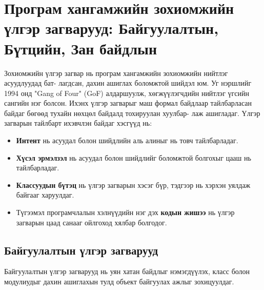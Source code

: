 \section{Програм хангамжийн зохиомжийн үлгэр загварууд: Байгуулалтын, Бүтцийн, Зан байдлын}
Зохиомжийн үлгэр загвар нь програм хангамжийн зохиомжийн нийтлэг асуудлуудад бат- лагдсан, дахин ашиглах боломжтой шийдэл юм. Уг нэршлийг 1994 онд "Gang of Four" (GoF) алдаршуулж, хөгжүүлэгчдийн нийтлэг үгсийн сангийн нэг болсон. Ихэнх үлгэр загварыг маш формал байдлаар тайлбарласан байдаг бөгөөд тухайн нөхцөл байдалд тохируулан хуулбар- лаж ашигладаг. Үлгэр загварын тайлбарт ихэвчлэн байдаг хэсгүүд нь:
\begin{itemize}
	\item \textbf{Интент} нь асуудал болон шийдлийн аль алиныг нь товч тайлбарладаг.
	\item \textbf{Хүсэл эрмэлзэл} нь асуудал болон шийдлийг боломжтой болгохыг цааш нь тайлбарладаг.
	\item \textbf{Классуудын бүтэц} нь үлгэр загварын хэсэг бүр, тэдгээр нь хэрхэн уялдаж байгааг харуулдаг.
	\item Түгээмэл програмчлалын хэлнүүдийн нэг дэх \textbf{кодын жишээ} нь үлгэр загварын цаад санааг ойлгоход хялбар болгодог.
\end{itemize}
\subsection{Байгуулалтын үлгэр загварууд}
Байгуулалтын үлгэр загварууд нь уян хатан байдлыг нэмэгдүүлэх, класс болон модулиудыг дахин ашиглахын тулд объект байгуулах ажлыг зохицуулдаг.

